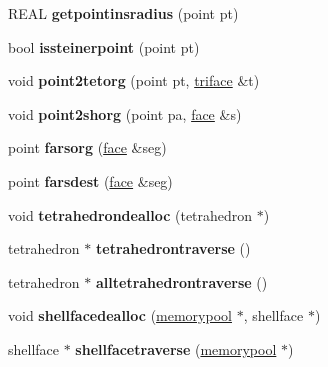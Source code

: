 \begin{DoxyCompactItemize}
R\+E\+AL {\bfseries getpointinsradius} (point pt)
\item 
\mbox{\label{classtetgenmesh_a76c5fa93567b170e17955e43f0677ccd}} 
bool {\bfseries issteinerpoint} (point pt)
\item 
\mbox{\label{classtetgenmesh_a08a487daca1979751e3d4e536182cbc3}} 
void {\bfseries point2tetorg} (point pt, \hyperlink{classtetgenmesh_1_1triface}{triface} \&t)
\item 
\mbox{\label{classtetgenmesh_a954a60725f3469a3fef1dd728b771de3}} 
void {\bfseries point2shorg} (point pa, \hyperlink{classtetgenmesh_1_1face}{face} \&s)
\item 
\mbox{\label{classtetgenmesh_a4cfceaae09b75d47e9f99fa1fc475d2a}} 
point {\bfseries farsorg} (\hyperlink{classtetgenmesh_1_1face}{face} \&seg)
\item 
\mbox{\label{classtetgenmesh_a08a4f8d3b4b894aa461e3b3574bdd606}} 
point {\bfseries farsdest} (\hyperlink{classtetgenmesh_1_1face}{face} \&seg)
\item 
\mbox{\label{classtetgenmesh_a29b3b481a2306b71f81c975481a890e1}} 
void {\bfseries tetrahedrondealloc} (tetrahedron $\ast$)
\item 
\mbox{\label{classtetgenmesh_a11da430cc44475b41fdbfc80de511192}} 
tetrahedron $\ast$ {\bfseries tetrahedrontraverse} ()
\item 
\mbox{\label{classtetgenmesh_afacb84170cf526490d58e2e5a633d6e8}} 
tetrahedron $\ast$ {\bfseries alltetrahedrontraverse} ()
\item 
\mbox{\label{classtetgenmesh_ab368f639981dcf465b5e8654942bcc69}} 
void {\bfseries shellfacedealloc} (\hyperlink{classtetgenmesh_1_1memorypool}{memorypool} $\ast$, shellface $\ast$)
\item 
\mbox{\label{classtetgenmesh_ae50ecae1d69935b12a4fa7ca843011d7}} 
shellface $\ast$ {\bfseries shellfacetraverse} (\hyperlink{classtetgenmesh_1_1memorypool}{memorypool} $\ast$)
\item 

\end{DoxyCompactItemize}
